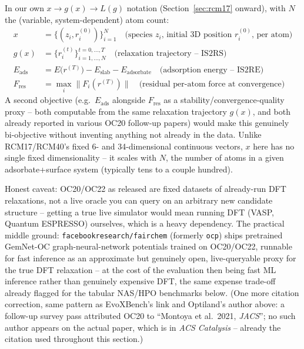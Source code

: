 \documentclass[11pt]{article}
\begin{document}
In our own $x \to g(x) \to L(g)$ notation (Section~\ref{sec:rcm17}
onward), with $N$ the (variable, system-dependent) atom count:
\begin{align}
x &= \{(z_i, r_i^{(0)})\}_{i=1}^{N} \quad \text{(species $z_i$, initial 3D position $r_i^{(0)}$, per atom)} \\
g(x) &= \{r_i^{(t)}\}_{i=1,\ldots,N}^{t=0,\ldots,T} \quad \text{(relaxation trajectory -- IS2RS)} \\
E_{\text{ads}} &= E\big(r^{(T)}\big) - E_{\text{slab}} - E_{\text{adsorbate}} \quad \text{(adsorption energy -- IS2RE)} \\
F_{\text{res}} &= \max_i \big\| F_i(r^{(T)}) \big\| \quad \text{(residual per-atom force at convergence)}
\end{align}
A second objective (e.g.\ $E_{\text{ads}}$ alongside $F_{\text{res}}$ as
a stability/convergence-quality proxy -- both computable from the same
relaxation trajectory $g(x)$, and both already reported in various OC20
follow-up papers) would make this genuinely bi-objective without
inventing anything not already in the data. Unlike RCM17/RCM40's fixed
6- and 34-dimensional continuous vectors, $x$ here has no single fixed
dimensionality -- it scales with $N$, the number of atoms in a given
adsorbate+surface system (typically tens to a couple hundred).

Honest caveat: OC20/OC22 as released are fixed datasets of already-run
DFT relaxations, not a live oracle you can query on an arbitrary new
candidate structure -- getting a true live simulator would mean running
DFT (VASP, Quantum ESPRESSO) ourselves, which is a heavy dependency. The
practical middle ground: \texttt{facebookresearch/fairchem} (formerly
\texttt{ocp}) ships pretrained GemNet-OC graph-neural-network potentials
trained on OC20/OC22, runnable for fast inference as an approximate but
genuinely open, live-queryable proxy for the true DFT relaxation -- at
the cost of the evaluation then being fast ML inference rather than
genuinely expensive DFT, the same expense trade-off already flagged for
the tabular NAS/HPO benchmarks below. (One more citation correction,
same pattern as EvoXBench's link and Optiland's author above: a
follow-up survey pass attributed OC20 to ``Montoya et al.\ 2021,
\emph{JACS}''; no such author appears on the actual paper, which is
\citet{chanussot2021oc20} in \emph{ACS Catalysis} -- already the citation
used throughout this section.)
\end{document}
